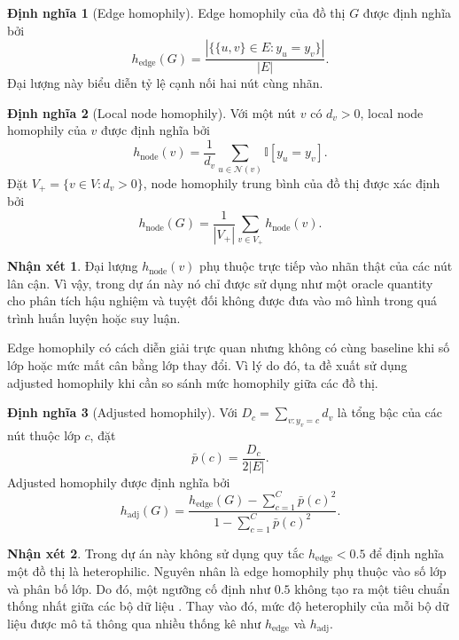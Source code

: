 \documentclass[12pt,a4paper]{article}
\numberwithin{equation}{section}
\theoremstyle{definition}
\newtheorem{definition}{Định nghĩa}[section]
\newtheorem{remark}{Nhận xét}[section]
\begin{document}
\begin{definition}[Edge homophily]
Edge homophily của đồ thị $G$ được định nghĩa bởi
\begin{equation}
h_{\text{edge}}(G) = \frac{|\{\{u, v\} \in E : y_u = y_v\}|}{|E|}.
\end{equation}
Đại lượng này biểu diễn tỷ lệ cạnh nối hai nút cùng nhãn.
\end{definition}

\begin{definition}[Local node homophily]
Với một nút $v$ có $d_v > 0$, local node homophily của $v$ được định nghĩa bởi
\begin{equation}
h_{\text{node}}(v) = \frac{1}{d_v} \sum_{u \in \mathcal{N}(v)} \mathbb{I}[y_u = y_v].
\end{equation}
Đặt $V_+ = \{v \in V : d_v > 0\}$, node homophily trung bình của đồ thị được xác định bởi
\begin{equation}
h_{\text{node}}(G) = \frac{1}{|V_+|} \sum_{v \in V_+} h_{\text{node}}(v).
\end{equation}
\end{definition}

\begin{remark}
Đại lượng $h_{\text{node}}(v)$ phụ thuộc trực tiếp vào nhãn thật của các nút lân cận. Vì vậy, trong dự án này nó chỉ được sử dụng như một oracle quantity cho phân tích hậu nghiệm và tuyệt đối không được đưa vào mô hình trong quá trình huấn luyện hoặc suy luận.
\end{remark}

Edge homophily có cách diễn giải trực quan nhưng không có cùng baseline khi số lớp hoặc mức mất cân bằng lớp thay đổi. Vì lý do đó, ta đề xuất sử dụng adjusted homophily khi cần so sánh mức homophily giữa các đồ thị.

\begin{definition}[Adjusted homophily]
Với $D_c = \sum_{v: y_v=c} d_v$ là tổng bậc của các nút thuộc lớp $c$, đặt
\begin{equation}
\bar{p}(c) = \frac{D_c}{2|E|}.
\end{equation}
Adjusted homophily được định nghĩa bởi
\begin{equation}
h_{\text{adj}}(G) = \frac{h_{\text{edge}}(G) - \sum_{c=1}^C \bar{p}(c)^2}{1 - \sum_{c=1}^C \bar{p}(c)^2}.
\end{equation}
\end{definition}

\begin{remark}
Trong dự án này không sử dụng quy tắc $h_{\text{edge}} < 0.5$ để định nghĩa một đồ thị là heterophilic. Nguyên nhân là edge homophily phụ thuộc vào số lớp và phân bố lớp. Do đó, một ngưỡng cố định như $0.5$ không tạo ra một tiêu chuẩn thống nhất giữa các bộ dữ liệu . Thay vào đó, mức độ heterophily của mỗi bộ dữ liệu được mô tả thông qua nhiều thống kê như $h_{\text{edge}}$ và $h_{\text{adj}}$.
\end{remark}
\end{document}
